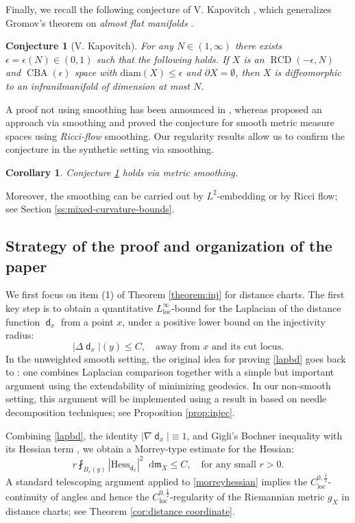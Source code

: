 \documentclass[11pt,reqno]{amsart}
\newtheorem{corollary}[theorem]{Corollary}
\newtheorem{conjecture}[theorem]{Conjecture}
\theoremstyle{definition}
\numberwithin{equation}{section}
\newcommand{\di}{\mathop{}\!\mathrm{d}}
\newcommand{\meas}{\mathfrak{m}}
\DeclareMathOperator{\CBA}{CBA}
\DeclareMathOperator{\dist}{\mathsf{d}}
\DeclareMathOperator{\loc}{loc}
\DeclareMathOperator{\RCD}{RCD}
\begin{document}
Finally, we recall the following conjecture of V. Kapovitch \cite{Kapovitch}, which generalizes Gromov's theorem on \textit{almost flat manifolds} \cite{Gromov,Ruh}.
\begin{conjecture}[V. Kapovitch]\label{conjectureK}
For any $N \in (1, \infty)$ there exists $\epsilon=\epsilon(N) \in (0,1)$ such that the following holds. If $X$ is an $\RCD(-\epsilon, N)$ and $\CBA(\epsilon)$ space with $\mathrm{diam}(X) \le \epsilon$ and $\partial X =\emptyset$, then $X$ is diffeomorphic to an infranilmanifold of dimension at most $N$.
\end{conjecture}
A proof not using smoothing has been announced in \cite{wang}, whereas \cite{Kapovitch} proposed an approach via smoothing and proved the conjecture for smooth metric measure spaces using \textit{Ricci-flow} smoothing. Our regularity results allow us to confirm the conjecture in the synthetic setting via smoothing.

\begin{corollary}\label{cor:kapovitch}
    Conjecture \ref{conjectureK} holds via metric smoothing.
\end{corollary}
Moreover, the smoothing can be carried out by $L^2$-embedding  or by Ricci flow; see Section \ref{ss:mixed-curvature-bounds}.


\subsection{Strategy of the proof and organization of the paper}
We first focus on item (1) of Theorem \ref{theorem:inj} for distance charts. 
The first key step is to obtain a quantitative $L^{\infty}_{\loc}$-bound for the Laplacian of the distance function $\dist_x$ from a point $x$, under a positive lower bound on the injectivity radius:
\begin{equation}\label{lapbd}
    |\Delta \dist_x|(y) \le C, \quad \text{away from $x$ and its cut locus.}
\end{equation}
In the unweighted smooth setting, the original idea for proving \eqref{lapbd} goes back to   \cite{AC}: one combines Laplacian comparison together with a simple but important argument using the extendability of minimizing geodesics. In our non-smooth setting, this argument will be implemented using a result in \cite{CM} based on needle decomposition techniques; see Proposition \ref{prop:injec}. 

Combining \eqref{lapbd}, the identity
$|\nabla \dist_x| \equiv 1$,
and Gigli's Bochner inequality with its Hessian term \cite{Gigli1}, we obtain a Morrey-type estimate for the Hessian:
\begin{equation}\label{morreyhessian}
    r\fint_{B_r(y)}|\mathrm{Hess}_{\dist_x}|^2\di \meas_X \le C, \quad \text{for any small $r>0$.}
\end{equation}
A standard telescoping argument applied to \eqref{morreyhessian} implies the $C^{0,\frac{1}{2}}_{\loc}$-continuity of angles and hence the $C^{0,\frac{1}{2}}_{\loc}$-regularity of the Riemannian metric $g_X$ in  distance charts; see Theorem \ref{cor:distance coordinate}. 
\end{document}
